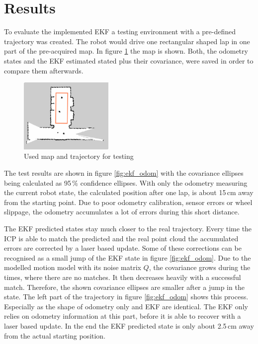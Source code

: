 \section{Results}
\label{sec:Results}


To evaluate the implemented EKF a testing environment with a pre-defined trajectory was created. The robot would drive one rectangular shaped lap in one part of the pre-acquired map. In figure \ref{fig:test_map} the map is shown. 
Both, the odometry states and the EKF estimated stated plus their covariance, were saved in order to compare them afterwards.
\begin{figure}[h]
\centering
\includegraphics[width=0.4\textwidth]{figures/test_map}
      \caption{Used map and trajectory for testing}
      \label{fig:test_map}
\end{figure}

The test results are shown in figure \ref{fig:ekf_odom} with the covariance ellipses being calculated as 95\,\% confidence ellipses. 
With only the odometry measuring the current robot state, the calculated position after one lap, is about 15\,cm away from the starting point. Due to poor odometry calibration, sensor errors or wheel slippage, the odometry accumulates a lot of errors during this short distance.

The EKF predicted states stay much closer to the real trajectory. Every time the ICP is able to match the predicted and the real point cloud the accumulated errors are corrected by a laser based update. Some of these corrections can be recognised as a small jump of the EKF state in figure \ref{fig:ekf_odom}. Due to the modelled motion model with its noise matrix $Q$, the covariance grows during the times, where there are no matches. It then decreases heavily with a successful match. Therefore, the shown covariance ellipses are smaller after a jump in the state. The left part of the trajectory in  figure \ref{fig:ekf_odom} shows this process. Especially as the shape of odometry only and EKF are identical. The EKF only relies on odometry information at this part, before it is able to recover with a laser based update. In the end the EKF predicted state is only about 2.5\,cm away from the actual starting position. 

